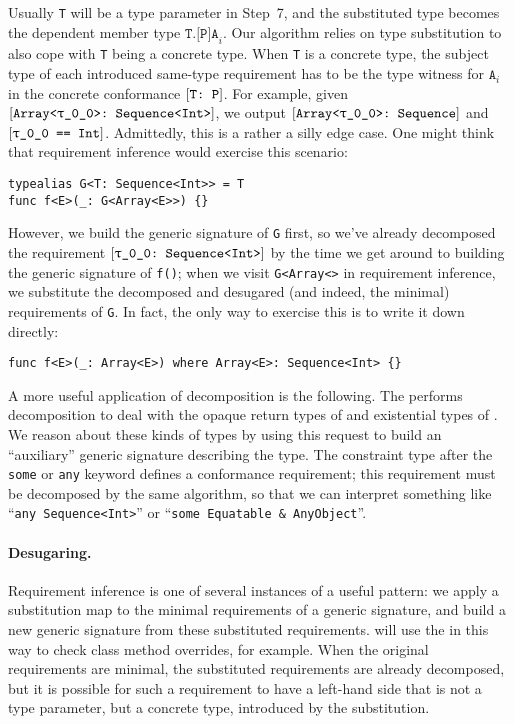 \documentclass[../generics]{subfiles}
\begin{document}
Usually \texttt{T} will be a type parameter in Step~7, and the substituted type becomes the dependent member type $\texttt{T.[P]A}_i$. Our algorithm relies on type substitution to also cope with \texttt{T} being a concrete type. When \texttt{T} is a concrete type, the subject type of each introduced same-type requirement has to be the type witness for $\texttt{A}_i$ in the concrete conformance $[\texttt{T:~P}]$. For example, given $[\texttt{Array<\texttt{$\uptau$\_0\_0}>:~Sequence<Int>}]$, we output $[\texttt{Array<\texttt{$\uptau$\_0\_0}>:~Sequence}]$ and $\SameReq{\rT}{Int}$. Admittedly, this is a rather a silly edge case. One might think that requirement inference would exercise this scenario:
\begin{Verbatim}
typealias G<T: Sequence<Int>> = T
func f<E>(_: G<Array<E>>) {}
\end{Verbatim}
However, we build the generic signature of \texttt{G} first, so we've already decomposed the requirement $[\texttt{\texttt{$\uptau$\_0\_0}:~Sequence<Int>}]$ by the time we get around to building the generic signature of \texttt{f()}; when we visit \texttt{G<Array<\rT>} in requirement inference, we substitute the decomposed and desugared (and indeed, the minimal) requirements of \texttt{G}. In fact, the only way to exercise this is to write it down directly:
\begin{Verbatim}
func f<E>(_: Array<E>) where Array<E>: Sequence<Int> {}
\end{Verbatim}

A more useful application of decomposition is the following. The  performs decomposition to deal with the opaque return types of  and existential types of . We reason about these kinds of types by using this request to build an ``auxiliary'' generic signature describing the type. The constraint type after the \texttt{some} or \texttt{any} keyword defines a conformance requirement; this requirement must be decomposed by the same algorithm, so that we can interpret something like ``\texttt{any Sequence<Int>}'' or ``\verb|some Equatable & AnyObject|''.

\paragraph{Desugaring.}
Requirement inference is one of several instances of a useful pattern: we apply a substitution map to the minimal requirements of a generic signature, and build a new generic signature from these substituted requirements.  will use the  in this way to check class method overrides, for example. When the original requirements are minimal, the substituted requirements are already decomposed, but it is possible for such a requirement to have a left-hand side that is not a type parameter, but a concrete type, introduced by the substitution.
\end{document}

